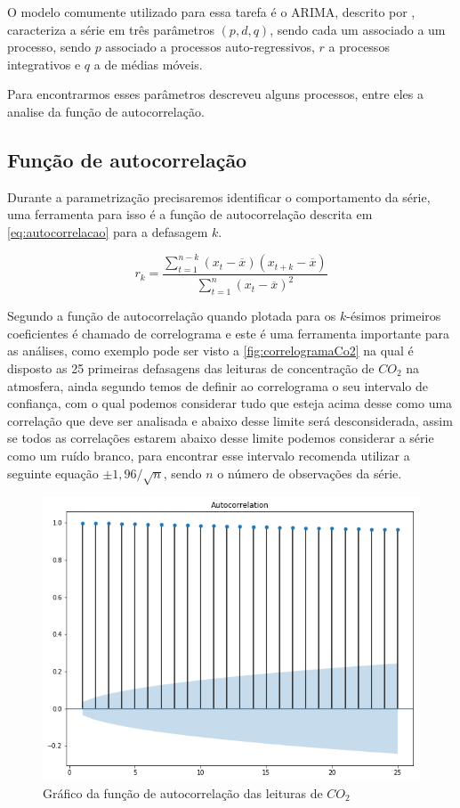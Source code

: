 \documentclass[
    12pt,
    oneside,
    a4paper,
    english,
    brazil
]{abntex2}
\begin{document}
O modelo comumente utilizado para essa tarefa é o ARIMA, descrito por
, caracteriza a série em três parâmetros $(p,d,q)$, sendo cada
um associado a um processo, sendo $p$ associado a processos auto-regressivos,
$r$ a processos integrativos e $q$ a de médias móveis.

Para encontrarmos esses parâmetros  descreveu alguns processos,
entre eles a analise da função de autocorrelação.

\subsection{Função de autocorrelação}\label{sec:corre}

Durante a parametrização precisaremos identificar o comportamento da série, uma
ferramenta para isso é a função de autocorrelação descrita em
\autoref{eq:autocorrelacao} para a defasagem $k$.

\begin{equation}
    \label{eq:autocorrelacao}
    r_k = \frac{\sum_{t=1}^{n-k}{(x_t - \overline{x})(x_{t+k} -
    \overline{x})}}{\sum_{t=1}^{n}{(x_t - \overline{x})^2}}
\end{equation}

Segundo  a função de autocorrelação quando plotada para os
$k$-ésimos primeiros coeficientes é chamado de correlograma e este é uma
ferramenta importante para as análises, como exemplo pode ser visto a
\autoref{fig:correlogramaCo2} na qual é disposto as 25 primeiras defasagens das
leituras de concentração de $CO_2$ na atmosfera, ainda segundo
 temos de definir ao correlograma o seu intervalo de
confiança, com o qual podemos considerar tudo que esteja acima desse como uma
correlação que deve ser analisada e abaixo desse limite será desconsiderada,
assim se todos as correlações estarem abaixo desse limite podemos considerar a
série como um ruído branco, para encontrar esse intervalo 
recomenda utilizar a seguinte equação $\pm{}1,96/\sqrt{n}$, sendo $n$ o número
de observações da série.

\begin{figure}
    \centering
    \caption{Gráfico da função de autocorrelação das leituras de
        $CO_2$}\label{fig:correlogramaCo2}
    \includegraphics[width=.6\linewidth]{images/acf_co2.png}
\end{figure}
\end{document}
